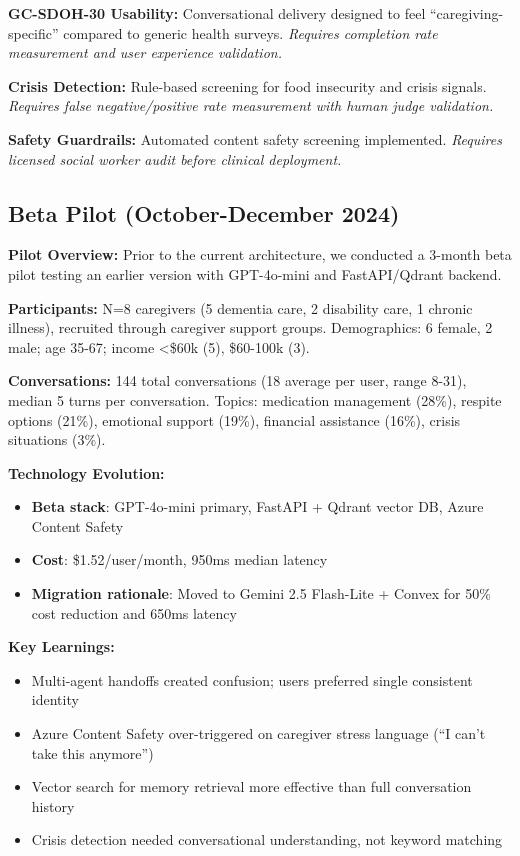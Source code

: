 \documentclass{article}
\begin{document}
\textbf{GC-SDOH-30 Usability:} Conversational delivery designed to feel ``caregiving-specific'' compared to generic health surveys. \textit{Requires completion rate measurement and user experience validation.}

\textbf{Crisis Detection:} Rule-based screening for food insecurity and crisis signals. \textit{Requires false negative/positive rate measurement with human judge validation.}

\textbf{Safety Guardrails:} Automated content safety screening implemented. \textit{Requires licensed social worker audit before clinical deployment.}

%
\subsection{Beta Pilot (October-December 2024)}%
\label{subsec:BetaPilot}%
\textbf{Pilot Overview:} Prior to the current architecture, we conducted a 3-month beta pilot testing an earlier version with GPT-4o-mini and FastAPI/Qdrant backend.

\textbf{Participants:} N=8 caregivers (5 dementia care, 2 disability care, 1 chronic illness), recruited through caregiver support groups. Demographics: 6 female, 2 male; age 35-67; income <\$60k (5), \$60-100k (3).

\textbf{Conversations:} 144 total conversations (18 average per user, range 8-31), median 5 turns per conversation. Topics: medication management (28\%), respite options (21\%), emotional support (19\%), financial assistance (16\%), crisis situations (3\%).

\textbf{Technology Evolution:}
\begin{itemize}[nosep,leftmargin=1em]
    \item \textbf{Beta stack}: GPT-4o-mini primary, FastAPI + Qdrant vector DB, Azure Content Safety
    \item \textbf{Cost}: \$1.52/user/month, 950ms median latency
    \item \textbf{Migration rationale}: Moved to Gemini 2.5 Flash-Lite + Convex for 50\% cost reduction and 650ms latency
\end{itemize}

\textbf{Key Learnings:}
\begin{itemize}[nosep,leftmargin=1em]
    \item Multi-agent handoffs created confusion; users preferred single consistent identity
    \item Azure Content Safety over-triggered on caregiver stress language (``I can't take this anymore'')
    \item Vector search for memory retrieval more effective than full conversation history
    \item Crisis detection needed conversational understanding, not keyword matching
\end{itemize}
\end{document}
